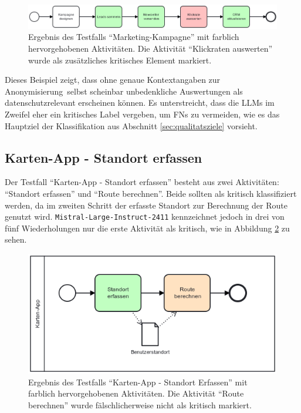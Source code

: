 \begin{figure}[h]
    \centering
    \includegraphics[width=\textwidth]{images/results/examples/oss-20b-run-1-small-marketing}
    \caption{Ergebnis des Testfalls \enquote{Marketing-Kampagne} mit farblich hervorgehobenen Aktivitäten. Die Aktivität \enquote{Klickraten auswerten} wurde als zusätzliches kritisches Element markiert.}
    \label{fig:gptoss-fall}
\end{figure}

Dieses Beispiel zeigt, dass ohne genaue Kontextangaben zur Anonymisierung\linebreak~selbst scheinbar unbedenkliche Auswertungen als datenschutzrelevant erscheinen können. Es unterstreicht, dass die \acp{LLM} im Zweifel eher ein kritisches Label vergeben, um \acp{FN} zu vermeiden, wie es das Hauptziel der Klassifikation aus Abschnitt \ref{sec:qualitatsziele} vorsieht.

\subsection*{Karten-App - Standort erfassen}

Der Testfall \enquote{Karten-App - Standort erfassen} besteht aus zwei Aktivitäten: \enquote{Standort erfassen} und \enquote{Route berechnen}. Beide sollten als kritisch klassifiziert werden, da im zweiten Schritt der erfasste Standort zur Berechnung der Route genutzt wird. \texttt{Mistral-Large-Instruct-2411} kennzeichnet jedoch in drei von fünf Wiederholungen nur die erste Aktivität als kritisch, wie in Abbildung \ref{fig:mistral-fall} zu sehen.

\begin{figure}[h]
    \centering
    \includegraphics[width=.55\textwidth]{images/results/examples/mistral-large-run-3-small-maps-app}
    \caption{Ergebnis des Testfalls \enquote{Karten-App - Standort Erfassen} mit farblich hervorgehobenen Aktivitäten. Die Aktivität \enquote{Route berechnen} wurde fälschlicherweise nicht als kritisch markiert.}
    \label{fig:mistral-fall}
\end{figure}

